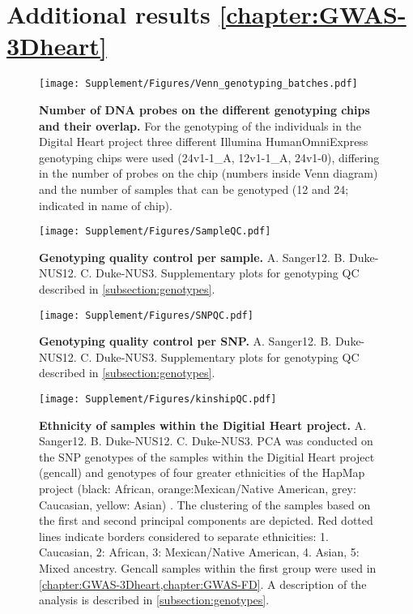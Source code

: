 \newpage
\section{Additional results \cref{chapter:GWAS-3Dheart}}
\begin{figure}[hbtp]
	\centering
	\texttt{[image: Supplement/Figures/Venn\_genotyping\_batches.pdf]}
	\caption[\textbf{Number of DNA probes on the different genotyping chips and their overlap.}]{\textbf{Number of DNA probes on the different genotyping chips and their overlap.} For the genotyping of the individuals in the Digital Heart project three different Illumina HumanOmniExpress genotyping chips were used (24v1-1\_A, 12v1-1\_A, 24v1-0), differing in the number of probes on the chip (numbers inside Venn diagram) and the number of samples that can be genotyped (12 and 24; indicated in name of chip).}
 	\label{fig:probeoverlap}
\end{figure}

\begin{figure}[hbtp]
	\centering
	\texttt{[image: Supplement/Figures/SampleQC.pdf]}
	\caption[\textbf{Genotyping quality control per sample.}]{\textbf{Genotyping quality control per sample.} A. Sanger12. B. Duke-NUS12. C. Duke-NUS3. Supplementary plots for genotyping QC described in \cref{subsection:genotypes}.}
 	\label{fig:sampleQC}
\end{figure}

\begin{figure}[hbtp]
	\centering
	\texttt{[image: Supplement/Figures/SNPQC.pdf]}
	\caption[\textbf{Genotyping quality control per SNP.}]{\textbf{Genotyping quality control per SNP.} A. Sanger12. B. Duke-NUS12. C. Duke-NUS3. Supplementary plots for genotyping QC described in \cref{subsection:genotypes}.}
 	\label{fig:SNPQC}
 	\end{figure}

\begin{figure}[hbtp]
	\centering
	\texttt{[image: Supplement/Figures/kinshipQC.pdf]}
	\caption[\textbf{Ethnicity of samples within the Digitial Heart project. }]{\textbf{Ethnicity of samples within the Digitial Heart project.} A. Sanger12. B. Duke-NUS12. C. Duke-NUS3. PCA was conducted on the SNP genotypes of the samples within the Digitial Heart project (gencall) and genotypes of four greater ethnicities of the HapMap project (black: African, orange:Mexican/Native American, grey: Caucasian, yellow: Asian) \citep{HapMap2005,HapMap2007}. The clustering of the samples based on the first and second principal components are depicted. Red dotted lines indicate borders considered to separate ethnicities: 1. Caucasian, 2: African, 3: Mexican/Native American, 4. Asian, 5: Mixed ancestry. Gencall samples within the first group were used in \cref{chapter:GWAS-3Dheart,chapter:GWAS-FD}.  A description of the analysis is described in \cref{subsection:genotypes}.}
 	\label{fig:kinshipQC}
\end{figure}


